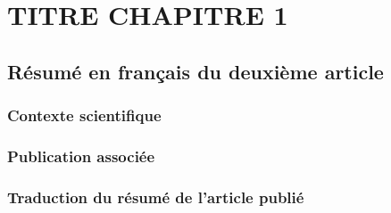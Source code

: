 \chapter{TITRE CHAPITRE 1}
\label{chap1}

\section{Résumé en français du deuxième article}

\subsection{Contexte scientifique}

\subsection{Publication associée}

\subsection{Traduction du résumé de l'article publié}
